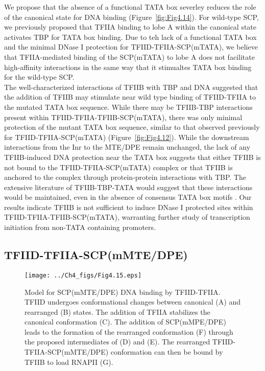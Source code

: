 \indent We propose that the absence of a functional TATA box severley reduces the role of the canonical state for DNA binding (Figure~\ref{fig:Fig4.14}). For wild-type SCP, we previously proposed that TFIIA binding to lobe A within the canonical state activates TBP for TATA box binding. Due to teh lack of a functional TATA box and the minimal DNase I protection for TFIID-TFIIA-SCP(mTATA), we believe that TFIIA-mediated binding of the SCP(mTATA) to lobe A does not facilitate high-affinity interactions in the same way that it stimualtes TATA box binding for the wild-type SCP.\\
\indent The well-characterized interactions of TFIIB with TBP and DNA suggested that the addition of TFIIB may stimulate near wild type binding of TFIID-TFIIA to the mutated TATA box sequence. While there may be TFIIB-TBP interactions present within TFIID-TFIIA-TFIIB-SCP(mTATA), there was only minimal protection of the mutant TATA box sequence, similar to that observed previously for TFIID-TFIIA-SCP(mTATA) (Figure~\ref{fig:Fig4.12}). While the downstream interactions from the Inr to the MTE/DPE remain unchanged, the lack of any TFIIB-induced DNA protection near the TATA box suggests that either TFIIB is not bound to the TFIID-TFIIA-SCP(mTATA) complex or that TFIIB is anchored to the complex through protein-protein interactions with TBP. The extensive literature of TFIIB-TBP-TATA would suggest that these interactions would be maintained, even in the absence of consensus TATA box motifs \cite{Rhee_24}. Our results indicate TFIIB is not sufficient to induce DNase I protected sites within TFIID-TFIIA-TFIIB-SCP(mTATA), warranting further study of transcription initiation from non-TATA containing promoters.\\

\subsection{TFIID-TFIIA-SCP(mMTE/DPE)} 

\begin{figure}
\centering
\texttt{[image: ../Ch4\_figs/Fig4.15.eps]}
\caption[Model for SCP(mMTE/DPE) DNA binding by TFIID-TFIIA]{Model for SCP(mMTE/DPE) DNA binding by TFIID-TFIIA. TFIID undergoes conformational changes between canonical (A) and rearranged (B) states. The addition of TFIIA stabilizes the canonical conformation (C). The addition of SCP(mMPE/DPE) leads to the formation of the rearranged conformation (F) through the proposed intermediates of (D) and (E). The rearranged TFIID-TFIIA-SCP(mMTE/DPE) conformation can then be bound by TFIIB to load RNAPII (G).}
\label{fig:Fig4.15}
\end{figure}

